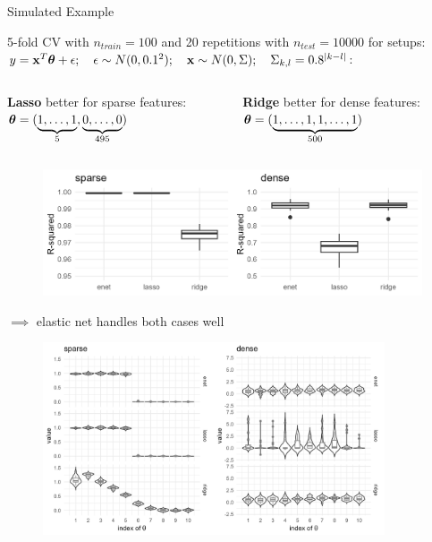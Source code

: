 \documentclass[11pt,compress,t,notes=noshow, xcolor=table]{beamer}
\begin{document}
\begin{vbframe} {Simulated Example}

\footnotesize
5-fold CV with $n_{train}=100$ and 20 repetitions with $n_{test}=10000$ for setups: $y =\mathbf{x}^T \bm{\theta} + \epsilon; \quad \epsilon \sim N(0,0.1^2);
  \quad \mathbf{x} \sim N(0, \Sigma); \quad\Sigma_{k,l}=0.8^{|k-l|}$: 
\vspace{-0.3cm}
\begin{columns}
\begin{column}{0.5\textwidth}
\begin{center}
{\footnotesize \textbf{Lasso} better for sparse features:} \\ 
$\bm{\theta}=(\underbrace{1,\ldots,1}_{5},\underbrace{0,\ldots,0}_{495})$\\
  \end{center}
\end{column}
\begin{column}{0.5\textwidth} 
\begin{center}
{\footnotesize \textbf{Ridge} better for dense features:} \\
$\bm{\theta}=(\underbrace{1,\ldots,1,1,\ldots,1}_{500})$ \\
\end{center}
\end{column}
\end{columns}

\begin{figure}
\includegraphics[width=\textwidth]{figure/enet_lasso_ridge_r2.png}\\
\end{figure}
{\normalsize $\implies$ elastic net handles both cases well}
\framebreak

\begin{figure}
\includegraphics[width=0.9\textwidth]{figure/enet_tradeoff.png}\\
\end{figure}



\end{vbframe}
\end{document}
